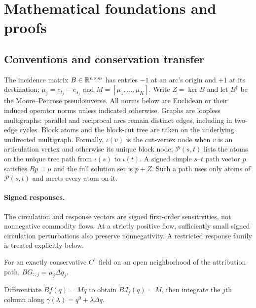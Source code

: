 \section{Mathematical foundations and proofs}\label{app:proofs}

\subsection{Conventions and conservation transfer}\label{app:notation}
The incidence matrix $B\in\mathbb{R}^{n\times m}$ has entries $-1$ at an arc's
origin and $+1$ at its destination; $\mu_j=e_{t_j}-e_{s_j}$ and
$M=[\mu_1,\ldots,\mu_K]$. Write $Z=\ker B$ and let $B^\dagger$ be the
Moore--Penrose pseudoinverse. All norms below are Euclidean or their
induced operator norms unless indicated otherwise. Graphs are loopless
multigraphs: parallel and reciprocal arcs remain distinct edges, including
in two-edge cycles. Block atoms and the block-cut tree are taken on the
underlying undirected multigraph. Formally, $\iota(v)$ is the cut-vertex
node when $v$ is an articulation vertex and otherwise its unique block
node; $\mathcal P(s,t)$ lists the atoms on the unique tree path from
$\iota(s)$ to $\iota(t)$. A signed simple $s$--$t$ path vector $p$ satisfies
$Bp=\mu$ and the full solution set is $p+Z$. Such a path uses only atoms
of $\mathcal P(s,t)$ and meets every atom on it.

\paragraph{Signed responses.}\label{app:signed}
The circulation and response vectors are signed first-order sensitivities,
not nonnegative commodity flows. At a strictly positive flow, sufficiently
small signed circulation perturbations also preserve nonnegativity. A
restricted response family is treated explicitly below.

\begin{corollary}[IG exchange]\label{cor:ig}
For an exactly conservative $C^1$ field on an open neighborhood of the
attribution path, $BG_{:,j}=\mu_j\Delta q_j$.
\end{corollary}
\begin{pf}
Differentiate $Bf(q)=Mq$ to obtain $BJ_f(q)=M$, then integrate the
$j$th column along $\gamma(\lambda)=q^0+\lambda\Delta q$.
\end{pf}

